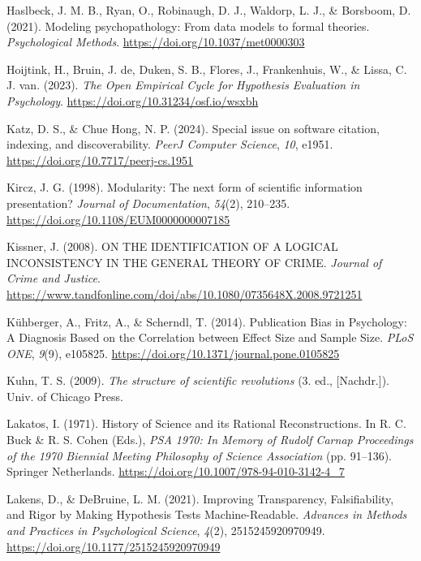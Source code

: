 \documentclass[
  man, noextraspace,floatsintext]{apa7}
\newlength{\cslhangindent}
\newenvironment{CSLReferences}[2] %
 {\begin{list}{}{%
  \setlength{\itemindent}{0pt}
  \setlength{\leftmargin}{0pt}
  \setlength{\parsep}{0pt}
  \ifodd #1
   \setlength{\leftmargin}{\cslhangindent}
   \setlength{\itemindent}{-1\cslhangindent}
  \fi
  \setlength{\itemsep}{#2\baselineskip}}}
 {\end{list}}
\begin{document}
\begin{CSLReferences}{1}{0}
Haslbeck, J. M. B., Ryan, O., Robinaugh, D. J., Waldorp, L. J., \& Borsboom, D. (2021). Modeling psychopathology: {From} data models to formal theories. \emph{Psychological Methods}. \url{https://doi.org/10.1037/met0000303}

Hoijtink, H., Bruin, J. de, Duken, S. B., Flores, J., Frankenhuis, W., \& Lissa, C. J. van. (2023). \emph{The {Open Empirical Cycle} for {Hypothesis Evaluation} in {Psychology}}. \url{https://doi.org/10.31234/osf.io/wsxbh}

Katz, D. S., \& Chue Hong, N. P. (2024). Special issue on software citation, indexing, and discoverability. \emph{PeerJ Computer Science}, \emph{10}, e1951. \url{https://doi.org/10.7717/peerj-cs.1951}

Kircz, J. G. (1998). Modularity: The next form of scientific information presentation? \emph{Journal of Documentation}, \emph{54}(2), 210--235. \url{https://doi.org/10.1108/EUM0000000007185}

Kissner, J. (2008). {ON THE IDENTIFICATION OF A LOGICAL INCONSISTENCY IN THE GENERAL THEORY OF CRIME}. \emph{Journal of Crime and Justice}. \url{https://www.tandfonline.com/doi/abs/10.1080/0735648X.2008.9721251}

Kühberger, A., Fritz, A., \& Scherndl, T. (2014). Publication {Bias} in {Psychology}: {A Diagnosis Based} on the {Correlation} between {Effect Size} and {Sample Size}. \emph{PLoS ONE}, \emph{9}(9), e105825. \url{https://doi.org/10.1371/journal.pone.0105825}

Kuhn, T. S. (2009). \emph{The structure of scientific revolutions} (3. ed., {[}Nachdr.{]}). Univ. of Chicago Press.

Lakatos, I. (1971). History of {Science} and its {Rational Reconstructions}. In R. C. Buck \& R. S. Cohen (Eds.), \emph{{PSA} 1970: {In Memory} of {Rudolf Carnap Proceedings} of the 1970 {Biennial Meeting Philosophy} of {Science Association}} (pp. 91--136). Springer Netherlands. \url{https://doi.org/10.1007/978-94-010-3142-4_7}

Lakens, D., \& DeBruine, L. M. (2021). Improving {Transparency}, {Falsifiability}, and {Rigor} by {Making Hypothesis Tests Machine-Readable}. \emph{Advances in Methods and Practices in Psychological Science}, \emph{4}(2), 2515245920970949. \url{https://doi.org/10.1177/2515245920970949}


\end{CSLReferences}
\end{document}
